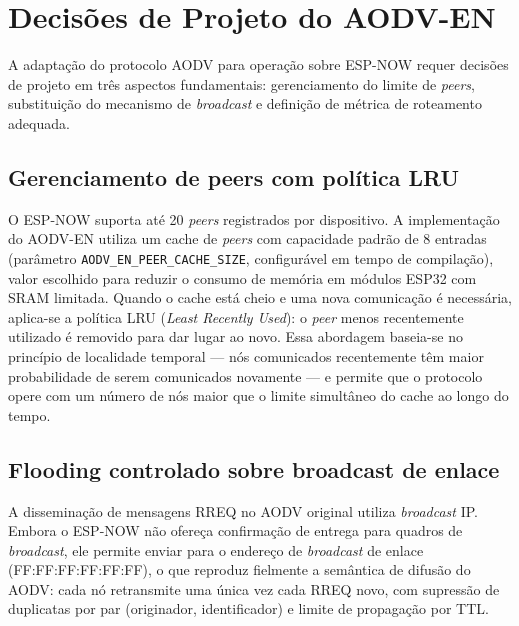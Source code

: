 \section{Decisões de Projeto do AODV-EN}\label{decisoes-de-projeto-do-aodv-en}

A adaptação do protocolo AODV para operação sobre ESP-NOW requer
decisões de projeto em três aspectos fundamentais: gerenciamento do
limite de \emph{peers}, substituição do mecanismo de \emph{broadcast} e
definição de métrica de roteamento adequada.

\subsection{Gerenciamento de peers com política
LRU}\label{gerenciamento-de-peers-com-poluxedtica-lru}

O ESP-NOW suporta até 20 \emph{peers} registrados por dispositivo.
A implementação do AODV-EN utiliza um cache de \emph{peers} com
capacidade padrão de 8 entradas (parâmetro \texttt{AODV\_EN\_PEER\_CACHE\_SIZE},
configurável em tempo de compilação), valor escolhido para reduzir
o consumo de memória em módulos ESP32 com SRAM limitada. Quando o
cache está cheio e uma nova comunicação é necessária, aplica-se a
política LRU (\emph{Least Recently Used}): o \emph{peer} menos
recentemente utilizado é removido para dar lugar ao novo. Essa abordagem
baseia-se no princípio de localidade temporal --- nós comunicados
recentemente têm maior probabilidade de serem comunicados novamente ---
e permite que o protocolo opere com um número de nós maior que o limite
simultâneo do cache ao longo do tempo.

\subsection{Flooding controlado sobre broadcast de
enlace}\label{flooding-controlado-sobre-broadcast-de-enlace}

A disseminação de mensagens RREQ no AODV original utiliza
\emph{broadcast} IP. Embora o ESP-NOW não ofereça confirmação de entrega
para quadros de \emph{broadcast}, ele permite enviar para o endereço de
\emph{broadcast} de enlace (FF:FF:FF:FF:FF:FF), o que reproduz fielmente
a semântica de difusão do AODV: cada nó retransmite uma única vez cada
RREQ novo, com supressão de duplicatas por par (originador,
identificador) e limite de propagação por TTL.

